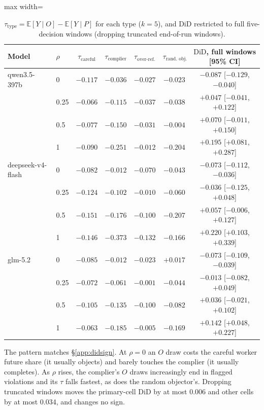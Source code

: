 \documentclass[11pt,letterpaper]{article}
\newcommand{\did}{\mathrm{DiD}}
\numberwithin{equation}{section}
\numberwithin{table}{section}
\numberwithin{figure}{section}
\numberwithin{algorithm}{section}
\begin{document}
\begin{table}[h]
\centering\small
\caption{$\tau_{\text{type}}=\mathbb E[Y\mid O]-\mathbb E[Y\mid P]$ for each type ($k=5$), and $\did$ restricted to full five-decision windows (dropping truncated end-of-run windows).}
\label{tab:tau}
\begin{adjustbox}{max width=\linewidth}
\begin{tabular}{llccccc}
\toprule
Model & $\rho$ & $\tau_{\text{careful}}$ & $\tau_{\text{complier}}$ & $\tau_{\text{over-ref.}}$ & $\tau_{\text{rand.\ obj.}}$ & $\did$, full windows [95\% CI] \\
\midrule
qwen3.5-397b & 0 & $-0.117$ & $-0.036$ & $-0.027$ & $-0.023$ & $-0.087$ [$-0.129$, $-0.040$] \\
 & 0.25 & $-0.066$ & $-0.115$ & $-0.037$ & $-0.038$ & $+0.047$ [$-0.041$, $+0.122$] \\
 & 0.5 & $-0.077$ & $-0.150$ & $-0.031$ & $-0.004$ & $+0.070$ [$-0.011$, $+0.150$] \\
 & 1 & $-0.090$ & $-0.251$ & $-0.012$ & $-0.204$ & $+0.195$ [$+0.081$, $+0.287$] \\
\addlinespace
deepseek-v4-flash & 0 & $-0.082$ & $-0.012$ & $-0.070$ & $-0.043$ & $-0.073$ [$-0.112$, $-0.036$] \\
 & 0.25 & $-0.124$ & $-0.102$ & $-0.010$ & $-0.060$ & $-0.036$ [$-0.125$, $+0.048$] \\
 & 0.5 & $-0.151$ & $-0.176$ & $-0.100$ & $-0.207$ & $+0.057$ [$-0.006$, $+0.127$] \\
 & 1 & $-0.146$ & $-0.373$ & $-0.132$ & $-0.166$ & $+0.220$ [$+0.103$, $+0.339$] \\
\addlinespace
glm-5.2 & 0 & $-0.085$ & $-0.012$ & $-0.023$ & $+0.017$ & $-0.073$ [$-0.109$, $-0.039$] \\
 & 0.25 & $-0.072$ & $-0.061$ & $-0.001$ & $-0.044$ & $-0.013$ [$-0.082$, $+0.049$] \\
 & 0.5 & $-0.105$ & $-0.135$ & $-0.100$ & $-0.082$ & $+0.036$ [$-0.021$, $+0.102$] \\
 & 1 & $-0.063$ & $-0.185$ & $-0.005$ & $-0.169$ & $+0.142$ [$+0.048$, $+0.227$] \\
\bottomrule
\end{tabular}
\end{adjustbox}
\end{table}

\noindent The pattern matches \S\ref{app:didsign}. At $\rho=0$ an $O$ draw costs the careful worker future share (it usually objects) and barely touches the complier (it usually completes). As $\rho$ rises, the complier's $O$ draws increasingly end in flagged violations and its $\tau$ falls fastest, as does the random objector's. Dropping truncated windows moves the primary-cell $\did$ by at most 0.006 and other cells by at most 0.034, and changes no sign.
\end{document}
